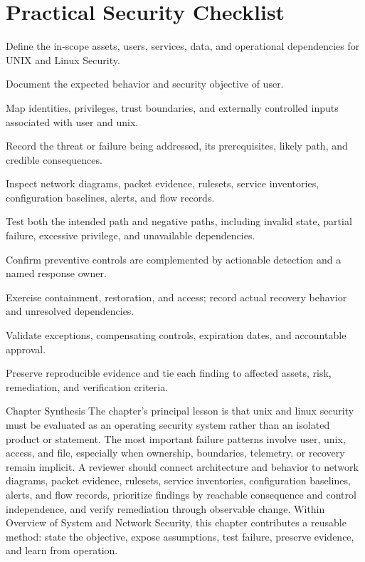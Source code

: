 \documentclass[11pt,letterpaper]{article}
\begin{document}
\section*{Practical Security Checklist}
\begin{CornellChecklist}
\item Define the in-scope assets, users, services, data, and operational dependencies for UNIX and Linux Security.
\item Document the expected behavior and security objective of user.
\item Map identities, privileges, trust boundaries, and externally controlled inputs associated with user and unix.
\item Record the threat or failure being addressed, its prerequisites, likely path, and credible consequences.
\item Inspect network diagrams, packet evidence, rulesets, service inventories, configuration baselines, alerts, and flow records.
\item Test both the intended path and negative paths, including invalid state, partial failure, excessive privilege, and unavailable dependencies.
\item Confirm preventive controls are complemented by actionable detection and a named response owner.
\item Exercise containment, restoration, and access; record actual recovery behavior and unresolved dependencies.
\item Validate exceptions, compensating controls, expiration dates, and accountable approval.
\item Preserve reproducible evidence and tie each finding to affected assets, risk, remediation, and verification criteria.
\end{CornellChecklist}
\begin{CornellSummaryBox}{Chapter Synthesis}
The chapter's principal lesson is that unix and linux security must be evaluated as an operating security system rather than an isolated product or statement. The most important failure patterns involve user, unix, access, and file, especially when ownership, boundaries, telemetry, or recovery remain implicit. A reviewer should connect architecture and behavior to network diagrams, packet evidence, rulesets, service inventories, configuration baselines, alerts, and flow records, prioritize findings by reachable consequence and control independence, and verify remediation through observable change. Within Overview of System and Network Security, this chapter contributes a reusable method: state the objective, expose assumptions, test failure, preserve evidence, and learn from operation.
\end{CornellSummaryBox}
\end{document}
